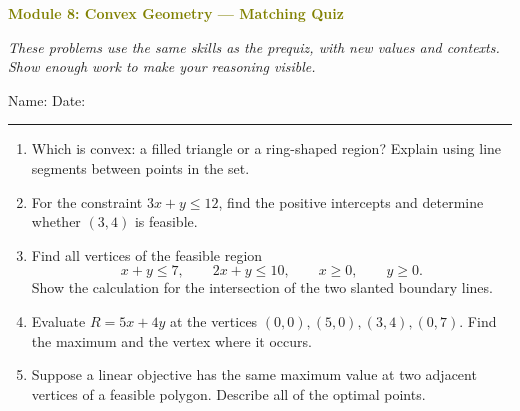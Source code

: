 \documentclass[11pt]{article}
\newcommand{\quizhead}[2]{%
  \clearpage
  {\Large\bfseries\textcolor{olive}{Module #1: #2 — Matching Quiz}}\par
  \textit{These problems use the same skills as the prequiz, with new values and contexts. Show enough work to make your reasoning visible.}\par
  Name: \hspace{2.6in} Date: \hspace{1.1in}\par
  \vspace{2pt}\textcolor{gold}{\rule{\linewidth}{1.2pt}}\par\smallskip
}
\newcommand{\workmed}{\par\vspace{0.62in}}
\newcommand{\worklarge}{\par\vspace{0.92in}}
\newcommand{\workxl}{\par\vspace{1.22in}}
\begin{document}
\quizhead{8}{Convex Geometry}
\begin{enumerate}
\item Which is convex: a filled triangle or a ring-shaped region? Explain using line segments between points in the set.
\workmed

\item For the constraint \(3x+y\le12\), find the positive intercepts and determine whether \((3,4)\) is feasible.
\worklarge

\item Find all vertices of the feasible region
\[
x+y\le7,
\qquad
2x+y\le10,
\qquad x\ge0,
\qquad y\ge0.
\]
Show the calculation for the intersection of the two slanted boundary lines.
\workxl

\item Evaluate \(R=5x+4y\) at the vertices \((0,0),(5,0),(3,4),(0,7)\). Find the maximum and the vertex where it occurs.
\worklarge

\item Suppose a linear objective has the same maximum value at two adjacent vertices of a feasible polygon. Describe all of the optimal points.
\workmed
\end{enumerate}
\end{document}
